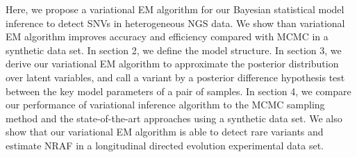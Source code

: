 \documentclass[11pt,reqno]{amsart}
\begin{document}
Here, we propose a variational EM algorithm for our Bayesian statistical model inference to detect SNVs in heterogeneous NGS data.
We show than variational EM algorithm improves accuracy and efficiency compared with MCMC in a synthetic data set.
In section 2, we define the model structure.
In section 3, we derive our variational EM algorithm to approximate the posterior distribution over latent variables, and call a variant by a posterior difference hypothesis test between the key model parameters of a pair of samples.
In section 4, we compare our performance of variational inference algorithm to the MCMC sampling method and the state-of-the-art approaches using a synthetic data set.
We also show that our variational EM algorithm is able to detect rare variants and estimate NRAF in a longitudinal directed evolution experimental data set.
\end{document}
